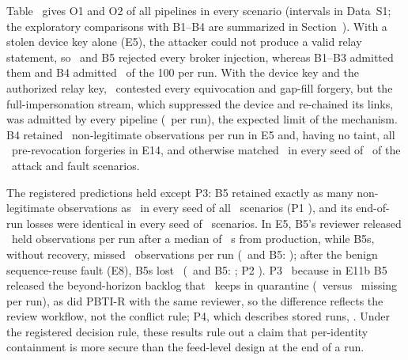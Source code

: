 Table~ gives O1 and O2 of all pipelines in every scenario (intervals in Data~S1; the exploratory comparisons with B1--B4 are summarized in Section~). With a stolen device key alone (E5), the attacker could not produce a valid relay statement, so \sys\ and B5 rejected every broker injection, whereas B1--B3 admitted them and B4 admitted \RAttrEFiveBFourstolenkeybroker\ of the 100 per run. With the device key and the authorized relay key, \sys\ contested every equivocation and gap-fill forgery, but the full-impersonation stream, which suppressed the device and re-chained its links, was admitted by every pipeline (\RSZeroFivePBTInonlegitauth\ per run), the expected limit of the mechanism. B4 retained \RSZeroFiveBFournonlegitauth\ non-legitimate observations per run in E5 and, having no taint, all \RSOneFourBFournonlegitauth\ pre-revocation forgeries in E14, and otherwise matched \sys\ in every seed of \RBFourMatches\ of the \RScenariosNonNormal\ attack and fault scenarios.

The registered predictions held except P3: B5 retained exactly as many non-legitimate observations as \sys\ in every seed of all \VPOneIdentical\ scenarios (P1 \VPOneHolds), and its end-of-run losses were identical in every seed of \VOTwoBFiveIdentical\ scenarios. In E5, B5's reviewer released \VSZeroFiveBFiverecoveredn\ held observations per run after a median of \VSZeroFiveBFiverecpfifty~s from production, while B5s, without recovery, missed \VSZeroFiveBFiveSlegitmissing\ observations per run (\sys\ and B5: \VSZeroFiveBFivelegitmissing); after the benign sequence-reuse fault (E8), B5s lost \VSZeroEightBFiveSlegitmissing\ (\sys\ and B5: \VSZeroEightPBTIlegitmissing; P2 \VPTwoHolds). P3 \VPThreeHolds\ because in E11b B5 released the beyond-horizon backlog that \sys\ keeps in quarantine (\VSOneTwoBFivelegitmissing\ versus \VSOneTwoPBTIlegitmissing\ missing per run), as did PBTI-R with the same reviewer, so the difference reflects the review workflow, not the conflict rule; P4, which describes stored runs, \VPFourHolds. Under the registered decision rule, these results rule out a claim that per-identity containment is more secure than the feed-level design at the end of a run.

